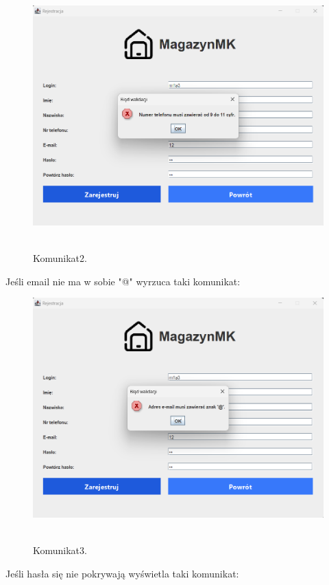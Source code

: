 \begin{figure}[H]
    \centering
    \includegraphics[width=.9\linewidth]{figures/RejestracjaKom2.png}\
    \caption{Komunikat2.\label{Komunikat2}}
\end{figure}

Jeśli email nie ma w sobie "@" wyrzuca taki komunikat:

\begin{figure}[H]
    \centering
    \includegraphics[width=.9\linewidth]{figures/RejestracjaKom3.png}\
    \caption{Komunikat3.\label{Komunikat3}}
\end{figure}

Jeśli hasła się nie pokrywają wyświetla taki komunikat:

